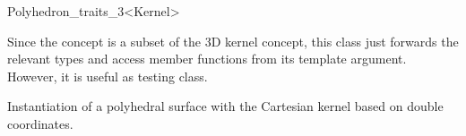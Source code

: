 \begin{ccRefClass}{Polyhedron_traits_3<Kernel>}

\ccSeeAlso


\ccImplementation

Since the  concept is a subset of the 3D
kernel concept, this class just forwards the relevant types and access
member functions from its template argument. However, it is useful
as testing class.

\ccExample

Instantiation of a polyhedral surface with the 
Cartesian kernel based on double coordinates. 


\end{ccRefClass}

\ccRefPageEnd


